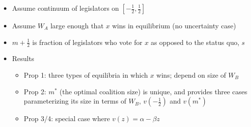 \documentclass[12pt]{article}
\begin{document}
\begin{itemize}
\begin{itemize}
		\end{itemize}
	\item Assume continuum of legislators on $\left[-\frac{1}{2},\frac{1}{2}\right]$
	\item Assume $W_A$ large enough that $x$ wins in equilibrium (no uncertainty case)
	\item $m + \frac{1}{2}$ is fraction of legislators who vote for $x$ as opposed to the status quo, $s$
	\item Results
	\begin{itemize}
		\item Prop 1: three types of equilibria in which $x$ wins; depend on size of $W_B$
		\item Prop 2: $m^*$ (the optimal coalition size) is unique, and provides three cases parameterizing its size in terms of $W_B$, $v(-\frac{1}{2})$ and $v(m^*)$
		\item Prop 3/4: special case where $v(z) = \alpha - \beta z$
	\end{itemize}
\end{itemize}
\end{document}
